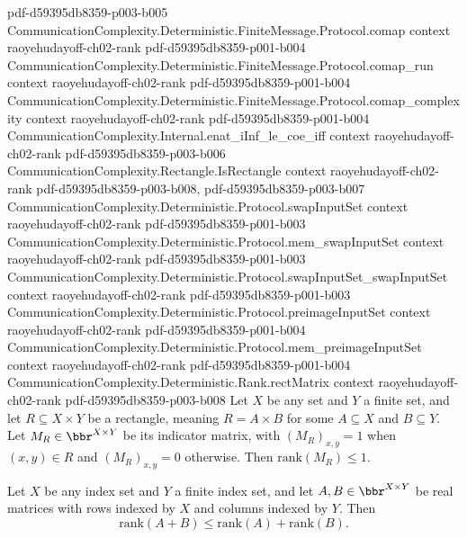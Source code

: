 \begin{theorem}
  {pdf-d59395db8359-p003-b005}
\proofstep
  {CommunicationComplexity.Deterministic.FiniteMessage.Protocol.comap}
  {context}
  {raoyehudayoff-ch02-rank}
  {pdf-d59395db8359-p001-b004}
\proofstep
  {CommunicationComplexity.Deterministic.FiniteMessage.Protocol.comap_run}
  {context}
  {raoyehudayoff-ch02-rank}
  {pdf-d59395db8359-p001-b004}
\proofstep
  {CommunicationComplexity.Deterministic.FiniteMessage.Protocol.comap_complexity}
  {context}
  {raoyehudayoff-ch02-rank}
  {pdf-d59395db8359-p001-b004}
\proofstep
  {CommunicationComplexity.Internal.enat_iInf_le_coe_iff}
  {context}
  {raoyehudayoff-ch02-rank}
  {pdf-d59395db8359-p003-b006}
\proofstep
  {CommunicationComplexity.Rectangle.IsRectangle}
  {context}
  {raoyehudayoff-ch02-rank}
  {pdf-d59395db8359-p003-b008,
    pdf-d59395db8359-p003-b007}
\proofstep
  {CommunicationComplexity.Deterministic.Protocol.swapInputSet}
  {context}
  {raoyehudayoff-ch02-rank}
  {pdf-d59395db8359-p001-b003}
\proofstep
  {CommunicationComplexity.Deterministic.Protocol.mem_swapInputSet}
  {context}
  {raoyehudayoff-ch02-rank}
  {pdf-d59395db8359-p001-b003}
\proofstep
  {CommunicationComplexity.Deterministic.Protocol.swapInputSet_swapInputSet}
  {context}
  {raoyehudayoff-ch02-rank}
  {pdf-d59395db8359-p001-b003}
\proofstep
  {CommunicationComplexity.Deterministic.Protocol.preimageInputSet}
  {context}
  {raoyehudayoff-ch02-rank}
  {pdf-d59395db8359-p001-b004}
\proofstep
  {CommunicationComplexity.Deterministic.Protocol.mem_preimageInputSet}
  {context}
  {raoyehudayoff-ch02-rank}
  {pdf-d59395db8359-p001-b004}
\proofstep
  {CommunicationComplexity.Deterministic.Rank.rectMatrix}
  {context}
  {raoyehudayoff-ch02-rank}
  {pdf-d59395db8359-p003-b008}
Let $X$ be any set and $Y$ a finite set, and let $R \subseteq X \times Y$ be a
rectangle, meaning $R = A \times B$ for some $A \subseteq X$ and $B \subseteq Y$. Let
$M_R \in \bbr^{X \times Y}$ be its indicator matrix, with $(M_R)_{x,y} = 1$ when $(x,y)
\in R$ and $(M_R)_{x,y} = 0$ otherwise. Then $\mathrm{rank}(M_R) \le 1$.
\end{theorem}

\begin{theorem}
\label{Matrix.rank_add_le}
\leanok
{}
Let $X$ be any index set and $Y$ a finite index set, and let $A, B \in \bbr^{X \times
Y}$ be real matrices with rows indexed by $X$ and columns indexed by $Y$. Then
\[
  \mathrm{rank}(A + B) \le \mathrm{rank}(A) + \mathrm{rank}(B).
\]
\end{theorem}

